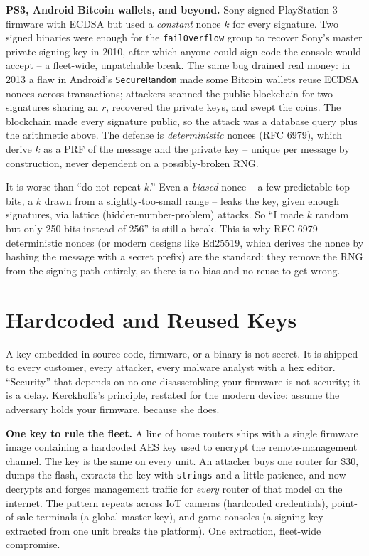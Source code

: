 \begin{attackbox}
\textbf{PS3, Android Bitcoin wallets, and beyond.} Sony signed PlayStation 3 firmware with ECDSA but used a \emph{constant} nonce $k$ for every signature. Two signed binaries were enough for the \texttt{fail0verflow} group to recover Sony's master private signing key in 2010, after which anyone could sign code the console would accept -- a fleet-wide, unpatchable break. The same bug drained real money: in 2013 a flaw in Android's \texttt{SecureRandom} made some Bitcoin wallets reuse ECDSA nonces across transactions; attackers scanned the public blockchain for two signatures sharing an $r$, recovered the private keys, and swept the coins. The blockchain made every signature public, so the attack was a database query plus the arithmetic above. The defense is \emph{deterministic} nonces (RFC 6979), which derive $k$ as a PRF of the message and the private key -- unique per message by construction, never dependent on a possibly-broken RNG.
\end{attackbox}

\begin{trapbox}
It is worse than ``do not repeat $k$.'' Even a \emph{biased} nonce -- a few predictable top bits, a $k$ drawn from a slightly-too-small range -- leaks the key, given enough signatures, via lattice (hidden-number-problem) attacks. So ``I made $k$ random but only 250 bits instead of 256'' is still a break. This is why RFC 6979 deterministic nonces (or modern designs like Ed25519, which derives the nonce by hashing the message with a secret prefix) are the standard: they remove the RNG from the signing path entirely, so there is no bias and no reuse to get wrong.
\end{trapbox}

\section{Hardcoded and Reused Keys}
\label{ch38:hardcoded-keys}

A key embedded in source code, firmware, or a binary is not secret. It is shipped to every customer, every attacker, every malware analyst with a hex editor. ``Security'' that depends on no one disassembling your firmware is not security; it is a delay. Kerckhoffs's principle, restated for the modern device: assume the adversary holds your firmware, because she does.

\begin{attackbox}
\textbf{One key to rule the fleet.} A line of home routers ships with a single firmware image containing a hardcoded AES key used to encrypt the remote-management channel. The key is the same on every unit. An attacker buys one router for \$30, dumps the flash, extracts the key with \texttt{strings} and a little patience, and now decrypts and forges management traffic for \emph{every} router of that model on the internet. The pattern repeats across IoT cameras (hardcoded credentials), point-of-sale terminals (a global master key), and game consoles (a signing key extracted from one unit breaks the platform). One extraction, fleet-wide compromise.
\end{attackbox}

